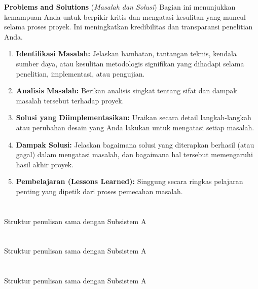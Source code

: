 \documentclass{elsinta}
\begin{document}
\textbf{Problems and Solutions} (\textit{Masalah dan Solusi})
Bagian ini menunjukkan kemampuan Anda untuk berpikir kritis dan mengatasi kesulitan yang muncul selama proses proyek. Ini meningkatkan kredibilitas dan transparansi penelitian Anda.
\begin{enumerate}
    \item \textbf{Identifikasi Masalah:} Jelaskan hambatan, tantangan teknis, kendala sumber daya, atau kesulitan metodologis signifikan yang dihadapi selama penelitian, implementasi, atau pengujian.
    \item \textbf{Analisis Masalah:} Berikan analisis singkat tentang sifat dan dampak masalah tersebut terhadap proyek.
    \item \textbf{Solusi yang Diimplementasikan:} Uraikan secara detail langkah-langkah atau perubahan desain yang Anda lakukan untuk mengatasi setiap masalah.
    \item \textbf{Dampak Solusi:} Jelaskan bagaimana solusi yang diterapkan berhasil (atau gagal) dalam mengatasi masalah, dan bagaimana hal tersebut memengaruhi hasil akhir proyek.
    \item \textbf{Pembelajaran (Lessons Learned):} Singgung secara ringkas pelajaran penting yang dipetik dari proses pemecahan masalah.
\end{enumerate}

\section{}
Struktur penulisan sama dengan Subsistem A
\section{}

Struktur penulisan sama dengan Subsistem A
   

\section{\SystemIntegrationTitle}
Struktur penulisan sama dengan Subsistem A
\end{document}
